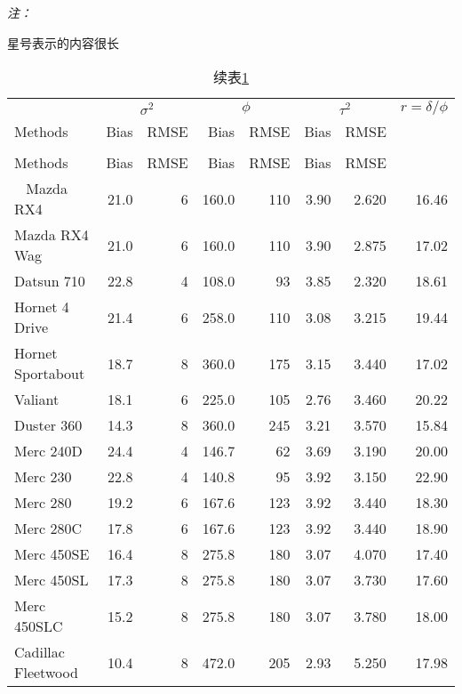 \documentclass[]{book}
\begin{document}
\begin{ThreePartTable}
\begin{TableNotes}
\item \textit{注：} 
\item * 星号表示的内容很长
\end{TableNotes}
\begin{longtable}[t]{lrrrrrrr}
\caption{\label{tab:kable}第1种类型的统计表格样式}\\
\toprule
\multicolumn{1}{c}{ } & \multicolumn{2}{c}{$\sigma^2$} & \multicolumn{2}{c}{$\phi$} & \multicolumn{2}{c}{$\tau^2$} & \multicolumn{1}{c}{$r=\delta/\phi$} \\
\cmidrule(l{2pt}r{2pt}){2-3} \cmidrule(l{2pt}r{2pt}){4-5} \cmidrule(l{2pt}r{2pt}){6-7} \cmidrule(l{2pt}r{2pt}){8-8}
Methods & Bias & RMSE & Bias & RMSE & Bias & RMSE & \\
\midrule
\endfirsthead
\caption[]{续表\ref{tab:kable}}\\
\toprule
Methods & Bias & RMSE & Bias & RMSE & Bias & RMSE & \\
\midrule
\endhead
\
\endfoot
\bottomrule
\insertTableNotes
\endlastfoot
Mazda RX4 & 21.0 & 6 & 160.0 & 110 & 3.90 & 2.620 & 16.46\\
Mazda RX4 Wag & 21.0 & 6 & 160.0 & 110 & 3.90 & 2.875 & 17.02\\
Datsun 710 & 22.8 & 4 & 108.0 & 93 & 3.85 & 2.320 & 18.61\\
Hornet 4 Drive & 21.4 & 6 & 258.0 & 110 & 3.08 & 3.215 & 19.44\\
Hornet Sportabout & 18.7 & 8 & 360.0 & 175 & 3.15 & 3.440 & 17.02\\
Valiant & 18.1 & 6 & 225.0 & 105 & 2.76 & 3.460 & 20.22\\
\midrule
Duster 360 & 14.3 & 8 & 360.0 & 245 & 3.21 & 3.570 & 15.84\\
Merc 240D & 24.4 & 4 & 146.7 & 62 & 3.69 & 3.190 & 20.00\\
Merc 230 & 22.8 & 4 & 140.8 & 95 & 3.92 & 3.150 & 22.90\\
Merc 280 & 19.2 & 6 & 167.6 & 123 & 3.92 & 3.440 & 18.30\\
Merc 280C & 17.8 & 6 & 167.6 & 123 & 3.92 & 3.440 & 18.90\\
Merc 450SE & 16.4 & 8 & 275.8 & 180 & 3.07 & 4.070 & 17.40\\
\midrule
Merc 450SL & 17.3 & 8 & 275.8 & 180 & 3.07 & 3.730 & 17.60\\
Merc 450SLC & 15.2 & 8 & 275.8 & 180 & 3.07 & 3.780 & 18.00\\
Cadillac Fleetwood & 10.4 & 8 & 472.0 & 205 & 2.93 & 5.250 & 17.98\\

\end{longtable}
\end{ThreePartTable}
\end{document}
